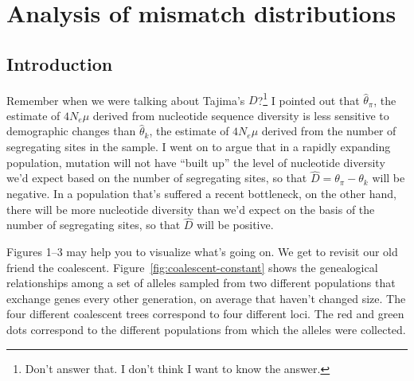 \chapter{Analysis of mismatch distributions}

\section*{Introduction}

Remember when we were talking about Tajima's $D$?\footnote{Don't
  answer that. I don't think I want to know the answer.} I pointed out
that $\hat \theta_\pi$, the estimate of $4N_e\mu$ derived from
nucleotide sequence diversity is less sensitive to demographic changes
than $\hat \theta_k$, the estimate of $4N_e\mu$ derived from the
number of segregating sites in the sample. I went on to argue that in
a rapidly expanding population, mutation will not have ``built up''
the level of nucleotide diversity we'd expect based on the number of
segregating sites, so that $\hat D = \theta_\pi - \theta_k$ will be
negative. In a population that's suffered a recent bottleneck, on the
other hand, there will be more nucleotide diversity than we'd expect
on the basis of the number of segregating sites, so that $\hat D$ will
be positive.

Figures 1--3 may help you to visualize what's going on. We get to
revisit our old friend the
coalescent. Figure~\ref{fig:coalescent-constant} shows the genealogical
relationships among a set of alleles sampled from two different
populations that exchange genes every other generation, on average
that haven't changed size. The four different coalescent trees
correspond to four different loci. The red and green dots correspond
to the different populations from which the alleles were collected.

